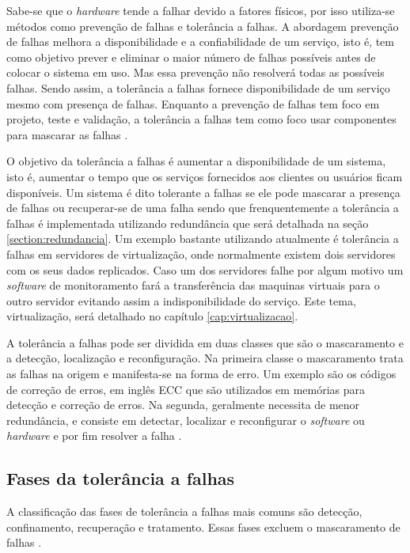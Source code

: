 Sabe-se que o \textit{hardware} tende a falhar devido a fatores físicos, por isso utiliza-se métodos como prevenção de falhas e 
tolerância a falhas. A abordagem prevenção de falhas melhora a disponibilidade e a confiabilidade de um serviço, isto é, tem como 
objetivo prever e eliminar o maior número de falhas possíveis antes de colocar o sistema em uso. Mas essa prevenção não resolverá todas 
as possíveis falhas. Sendo assim, a tolerância a falhas fornece disponibilidade de um serviço mesmo com presença de falhas. Enquanto a 
prevenção de falhas tem foco em projeto, teste e validação, a tolerância a falhas tem como foco usar componentes para mascarar as 
falhas \cite{pankaj1994}.

O objetivo da tolerância a falhas é aumentar a disponibilidade de um sistema, isto é, aumentar o tempo que os serviços fornecidos aos 
clientes ou usuários ficam disponíveis. Um sistema é dito tolerante a falhas se ele pode mascarar a presença de falhas ou recuperar-se 
de uma falha sendo que frenquentemente a tolerância a falhas é implementada utilizando redundância que será detalhada na seção 
\ref{section:redundancia}. Um exemplo bastante utilizando atualmente é tolerância a falhas em servidores de virtualização, onde normalmente
existem dois servidores com os seus dados replicados. Caso um dos servidores falhe por algum motivo um \textit{software} de monitoramento
fará a transferência das maquinas virtuais para o outro servidor evitando assim a indisponibilidade do serviço. Este tema, virtualização, 
será detalhado no capítulo \ref{cap:virtualizacao}.

A tolerância a falhas pode ser dividida em duas classes que são o mascaramento e a detecção, localização e reconfiguração.
Na primeira classe o mascaramento trata as falhas na origem e manifesta-se na forma de erro. Um exemplo são os códigos de correção de 
erros, em inglês \ac{ECC} que são utilizados em memórias para detecção e correção de erros.
Na segunda, geralmente necessita de menor redundância, e consiste em detectar, localizar e reconfigurar o \textit{software} ou
\textit{hardware} e por fim resolver a falha \cite{weber2002}.

\subsection{Fases da tolerância a falhas}

A classificação das fases de tolerância a falhas mais comuns são detecção, confinamento, recuperação e tratamento. Essas fases excluem
o mascaramento de falhas \cite{weber2002}.

